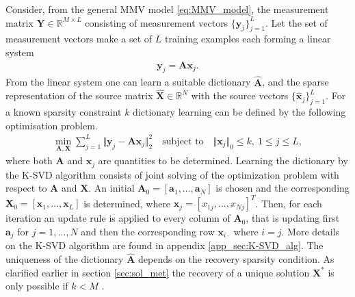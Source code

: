 Consider, from the general MMV model \eqref{eq:MMV_model}, the measurement matrix $\mathbf{Y} \in \mathbb{R}^{M \times L}$ consisting of measurement vectors $\lbrace \mathbf{y}_j \rbrace_{j=1}^L$. Let the set of measurement vectors make a set of $L$ training examples each forming a linear system
\begin{align*}
\mathbf{y}_j = \mathbf{A} \mathbf{x}_j.
\end{align*}
From the linear system one can learn a suitable dictionary $\hat{\mathbf{A}}$, and the sparse representation of the source matrix $\hat{\mathbf{X}} \in \mathbb{R}^N$ with the source vectors $\lbrace \hat{\mathbf{x}}_j \rbrace_{j=1}^L$.
For a known sparsity constraint $k$ dictionary learning can be defined by the following optimisation problem. 
\begin{align}\label{eq:SVD1}
\min_{\mathbf{A}, \mathbf{X}} \sum_{j=1}^{L} \Vert \mathbf{y}_j - \mathbf{A} \mathbf{x}_j \Vert_2^2 \quad \text{subject to} \quad \Vert \mathbf{x}_j \Vert_0 \leq k, \ 1 \leq j \leq L,
\end{align}
where both $\mathbf{A}$ and $\mathbf{x}_j$ are quantities to be determined.
Learning the dictionary by the K-SVD algorithm consists of joint solving of the optimization problem with respect to $\mathbf{A}$ and $\mathbf{X}$. 
An initial $\mathbf{A}_0 = [\mathbf{a}_1, \dots, \mathbf{a}_N]$ is chosen and the corresponding $\mathbf{X}_0 = [\mathbf{x}_1, \dots, \mathbf{x}_L]$ is determined, where $\mathbf{x}_j = [x_{1j}, \dots, x_{Nj}]^T$. Then, for each iteration an update rule is applied to every column of $\mathbf{A}_0$, that is updating first $\mathbf{a}_j$ for $j = 1, \dots, N$ and then the corresponding row $\mathbf{x}_{i\cdot}$ where $i=j$. 
More details on the K-SVD algorithm are found in appendix \ref{app_sec:K-SVD_alg}. 
The uniqueness of the dictionary $\hat{\mathbf{A}}$ depends on the recovery sparsity condition. As clarified earlier in section \ref{sec:sol_met} the recovery of a unique solution $\mathbf{X}^\ast$ is only possible if $k < M$ \cite{phd2015}.


